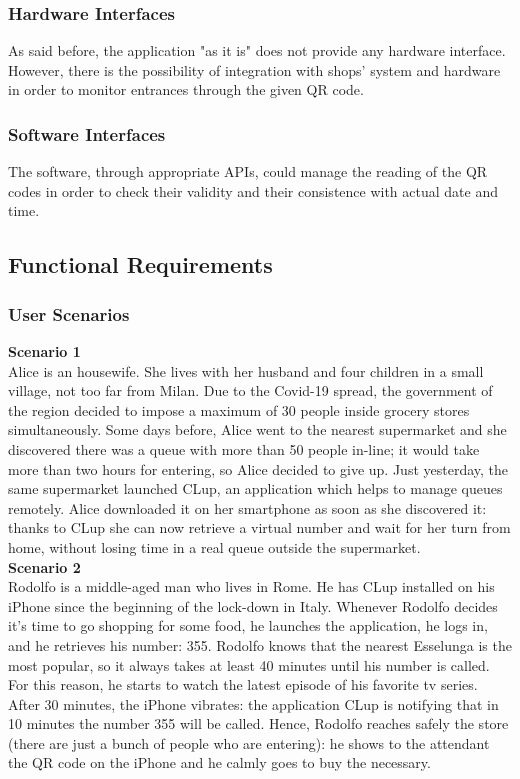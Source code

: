 \documentclass[table, 12pt]{article}
\begin{document}
\subsubsection{Hardware Interfaces}
As said before, the application "as it is" does not provide any hardware interface.
However, there is the possibility of integration with shops' system and hardware in order to monitor entrances through the given QR code.
\subsubsection{Software Interfaces}
The software, through appropriate APIs, could manage the reading of the QR codes in order to check their validity and their consistence with actual date and time.

\subsection{Functional Requirements}
\subsubsection{User Scenarios}
\textbf{Scenario 1}\\
Alice is an housewife. She lives with her husband and four children in a small village, not too far from Milan. Due to the Covid-19 spread, the government of the region decided to impose a maximum of 30 people inside grocery stores simultaneously. Some days before, Alice went to the nearest supermarket and she discovered there was a queue with more than 50 people in-line; it would take more than two hours for entering, so Alice decided to give up. Just yesterday, the same supermarket launched CLup, an application which helps to manage queues remotely. Alice downloaded it on her smartphone as soon as she discovered it: thanks to CLup she can now retrieve a virtual number and wait for her turn from home, without losing time in a real queue outside the supermarket.\\

\textbf{Scenario 2}\\
Rodolfo is a middle-aged man who lives in Rome. He has CLup installed on his iPhone since the beginning of the lock-down in Italy. Whenever Rodolfo decides it's time to go shopping for some food, he launches the application, he logs in, and he retrieves his number: 355. Rodolfo knows that the nearest Esselunga is the most popular, so it always takes at least 40 minutes until his number is called. For this reason, he starts to watch the latest episode of his favorite tv series. After 30 minutes, the iPhone vibrates: the application CLup is notifying that in 10 minutes the number 355 will be called. Hence, Rodolfo reaches safely the store (there are just a bunch of people who are entering): he shows to the attendant the QR code on the iPhone and he calmly goes to buy the necessary. \\
\end{document}
